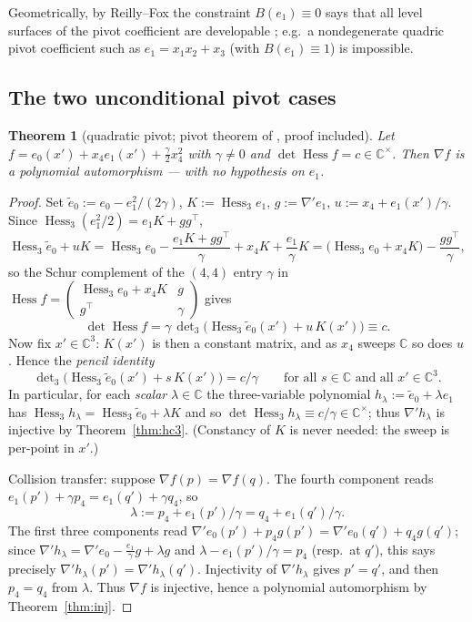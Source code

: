 \documentclass[11pt]{article}
\theoremstyle{plain}
\newtheorem{theorem}{Theorem}[section]
\theoremstyle{definition}
\newcommand{\C}{\mathbb{C}}
\newcommand{\Hess}{\operatorname{Hess}}
\begin{document}
Geometrically, by Reilly--Fox the constraint $B(e_1)\equiv0$ says that
all level surfaces of the pivot coefficient are developable
\cite{Reilly,Fox2017}; e.g.\ a nondegenerate quadric pivot coefficient
such as $e_1=x_1x_2+x_3$ (with $B(e_1)\equiv1$) is impossible.

\subsection{The two unconditional pivot cases}

\begin{theorem}[quadratic pivot; pivot theorem of \cite{companion},
proof included]\label{thm:quad}
Let $f=e_0(x')+x_4e_1(x')+\tfrac\gamma2x_4^2$ with $\gamma\ne0$ and
$\det\Hess f=c\in\C^{\times}$. Then $\nabla f$ is a polynomial
automorphism --- with no hypothesis on $e_1$.
\end{theorem}

\begin{proof}
Set $\tilde e_0:=e_0-e_1^2/(2\gamma)$, $K:=\Hess_3e_1$,
$g:=\nabla'e_1$, $u:=x_4+e_1(x')/\gamma$. Since
$\Hess_3(e_1^2/2)=e_1K+gg^{\top}$,
\[
\Hess_3\tilde e_0+uK
=\Hess_3e_0-\frac{e_1K+gg^{\top}}{\gamma}+x_4K+\frac{e_1}{\gamma}K
=\bigl(\Hess_3e_0+x_4K\bigr)-\frac{gg^{\top}}{\gamma},
\]
so the Schur complement of the $(4,4)$ entry $\gamma$ in
$\Hess f=\left(\begin{smallmatrix}\Hess_3e_0+x_4K&g\\
g^{\top}&\gamma\end{smallmatrix}\right)$ gives
\[
\det\Hess f=\gamma\,\det\nolimits_3\!\bigl(\Hess_3\tilde e_0(x')
+u\,K(x')\bigr)\equiv c .
\]
Now fix $x'\in\C^3$: $K(x')$ is then a constant matrix, and as $x_4$
sweeps $\C$ so does $u$. Hence the \emph{pencil identity}
\[
\det\nolimits_3\!\bigl(\Hess_3\tilde e_0(x')+s\,K(x')\bigr)=c/\gamma
\qquad\text{for all }s\in\C\text{ and all }x'\in\C^3 .
\]
In particular, for each \emph{scalar} $\lambda\in\C$ the three-variable
polynomial $h_\lambda:=\tilde e_0+\lambda e_1$ has
$\Hess_3h_\lambda=\Hess_3\tilde e_0+\lambda K$ and so
$\det\Hess_3h_\lambda\equiv c/\gamma\in\C^{\times}$; thus
$\nabla'h_\lambda$ is injective by Theorem~\ref{thm:hc3}. (Constancy of
$K$ is never needed: the sweep is per-point in $x'$.)

Collision transfer: suppose $\nabla f(p)=\nabla f(q)$. The fourth
component reads $e_1(p')+\gamma p_4=e_1(q')+\gamma q_4$, so
\[
\lambda:=p_4+e_1(p')/\gamma=q_4+e_1(q')/\gamma .
\]
The first three components read
$\nabla'e_0(p')+p_4g(p')=\nabla'e_0(q')+q_4g(q')$; since
$\nabla'h_\lambda=\nabla'e_0-\tfrac{e_1}{\gamma}g+\lambda g$ and
$\lambda-e_1(p')/\gamma=p_4$ (resp.\ at $q'$), this says precisely
$\nabla'h_\lambda(p')=\nabla'h_\lambda(q')$. Injectivity of
$\nabla'h_\lambda$ gives $p'=q'$, and then $p_4=q_4$ from $\lambda$.
Thus $\nabla f$ is injective, hence a polynomial automorphism by
Theorem~\ref{thm:inj}.
\end{proof}
\end{document}
